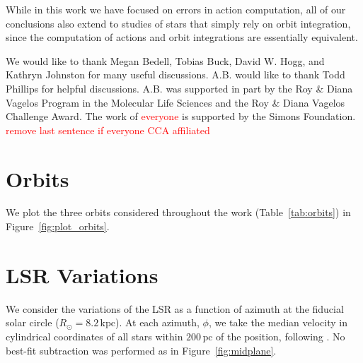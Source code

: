 \documentclass[twocolumn]{aastex62}
\newcommand{\Gus}[1]{\textcolor{red}{#1}}
\newcommand{\pc}{\text{pc}}
\newcommand{\kpc}{\text{kpc}}
\begin{document}
While in this work we have focused on errors in action computation, all of our
conclusions also extend to studies of stars that simply rely on orbit
integration, since the computation of actions and orbit integrations are
essentially equivalent.

\acknowledgments
We would like to thank Megan Bedell, Tobias Buck, David W. Hogg, and Kathryn
Johnston for many useful discussions. A.B. would like to thank Todd Phillips
for helpful discussions. A.B. was supported in part by the Roy \& Diana
Vagelos Program in the Molecular Life Sciences and the Roy \& Diana Vagelos
Challenge Award. The work of \Gus{everyone} is supported by the Simons
Foundation. \Gus{remove last sentence if everyone CCA affiliated}

\appendix
\section{Orbits} \label{app:orbits}
We plot the three orbits considered throughout the work
(Table~\ref{tab:orbits}) in Figure~\ref{fig:plot_orbits}.

\begin{figure*}
\caption{The three orbits presented in Table~\ref{tab:orbits} and considered
throughout the work. We plot the thin, thick, and halo orbits in the {\em
left}, {\em center}, and {\em right} columns, respectively. The {\em upper}
row shows a plot of $x$ vs. $y$ while the {\em lower} row shows $R$ vs. $z$.}
\label{fig:plot_orbits}
\end{figure*}

\section{LSR Variations} \label{app:lsr}
We consider the variations of the LSR as a function of azimuth at the fiducial
solar circle ($R_{\odot} = 8.2\,\kpc$). At each azimuth, $\phi$, we take the
median velocity in cylindrical coordinates of all stars within $200\,\pc$ of
the position, following \citet{2018arXiv180610564S}. No best-fit subtraction
was performed as in Figure~\ref{fig:midplane}.

\begin{figure*}
\caption{The local standard of rest (LSR) as a function of azimuth at the
fiducial Solar circle ($R_{\odot} = 8.2\,\kpc$). No best-fit subtraction is
performed here as we did in the case of the midplane
(Section~\ref{ssec:local_midplane}).}
\end{figure*}


\end{document}
